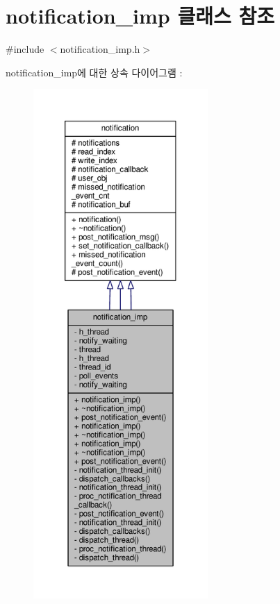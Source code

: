 \hypertarget{classavdecc__lib_1_1notification__imp}{}\section{notification\+\_\+imp 클래스 참조}
\label{classavdecc__lib_1_1notification__imp}


{\ttfamily \#include $<$notification\+\_\+imp.\+h$>$}



notification\+\_\+imp에 대한 상속 다이어그램 \+: 
\nopagebreak
\begin{figure}[H]
\begin{center}
\leavevmode
\includegraphics[height=550pt]{classavdecc__lib_1_1notification__imp__inherit__graph}
\end{center}
\end{figure}


